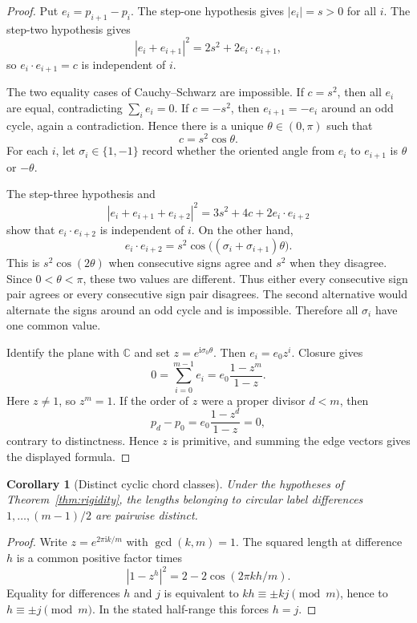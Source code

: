 \documentclass[11pt]{article}
\newtheorem{corollary}[theorem]{Corollary}
\begin{document}
\begin{proof}
Put $e_i=p_{i+1}-p_i$.  The step-one hypothesis gives $|e_i|=s>0$ for
all $i$.  The step-two hypothesis gives
\[
 |e_i+e_{i+1}|^2=2s^2+2e_i\mathbin{\cdot}e_{i+1},
\]
so $e_i\cdot e_{i+1}=c$ is independent of $i$.

The two equality cases of Cauchy--Schwarz are impossible.  If $c=s^2$,
then all $e_i$ are equal, contradicting $\sum_i e_i=0$.  If $c=-s^2$,
then $e_{i+1}=-e_i$ around an odd cycle, again a contradiction.  Hence
there is a unique $\theta\in(0,\pi)$ such that
\[
 c=s^2\cos\theta.
\]
For each $i$, let $\sigma_i\in\{1,-1\}$ record whether the oriented angle
from $e_i$ to $e_{i+1}$ is $\theta$ or $-\theta$.

The step-three hypothesis and
\[
 |e_i+e_{i+1}+e_{i+2}|^2
 =3s^2+4c+2e_i\mathbin{\cdot}e_{i+2}
\]
show that $e_i\cdot e_{i+2}$ is independent of $i$.  On the other hand,
\[
 e_i\mathbin{\cdot}e_{i+2}
 =s^2\cos\bigl((\sigma_i+\sigma_{i+1})\theta\bigr).
\]
This is $s^2\cos(2\theta)$ when consecutive signs agree and $s^2$ when
they disagree.  Since $0<\theta<\pi$, these two values are different.
Thus either every consecutive sign pair agrees or every consecutive sign
pair disagrees.  The second alternative would alternate the signs around an
odd cycle and is impossible.  Therefore all $\sigma_i$ have one common
value.

Identify the plane with $\mathbb C$ and set $z=e^{\mathrm i\sigma_0\theta}$.
Then $e_i=e_0z^i$.  Closure gives
\[
 0=\sum_{i=0}^{m-1}e_i=e_0\frac{1-z^m}{1-z}.
\]
Here $z\ne1$, so $z^m=1$.  If the order of $z$ were a proper divisor
$d<m$, then
\[
 p_d-p_0=e_0\frac{1-z^d}{1-z}=0,
\]
contrary to distinctness.  Hence $z$ is primitive, and summing the edge
vectors gives the displayed formula.
\end{proof}

\begin{corollary}[Distinct cyclic chord classes]\label{cor:chords}
Under the hypotheses of Theorem~\ref{thm:rigidity}, the lengths belonging
to circular label differences $1,\ldots,(m-1)/2$ are pairwise distinct.
\end{corollary}

\begin{proof}
Write $z=e^{2\pi\mathrm i k/m}$ with $\gcd(k,m)=1$.  The squared length
at difference $h$ is a common positive factor times
\[
 |1-z^h|^2=2-2\cos(2\pi kh/m).
\]
Equality for differences $h$ and $j$ is equivalent to
$kh\equiv\pm kj\pmod m$, hence to $h\equiv\pm j\pmod m$.  In the stated
half-range this forces $h=j$.
\end{proof}
\end{document}

